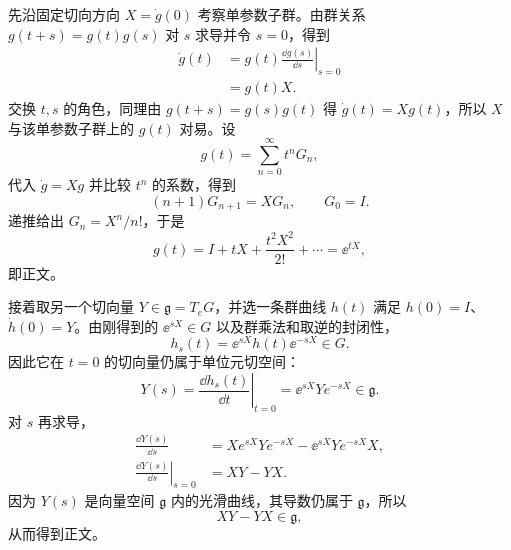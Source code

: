 \begin{derivation}
先沿固定切向方向 $X=\dot g(0)$ 考察单参数子群。由群关系 $g(t+s)=g(t)g(s)$ 对 $s$ 求导并令 $s=0$，得到
\begin{align*}
 \dot g(t)
 &=g(t)\left.\frac{\dd g(s)}{\dd s}\right|_{s=0}\\
 &=g(t)X.
\end{align*}
交换 $t,s$ 的角色，同理由 $g(t+s)=g(s)g(t)$ 得 $\dot g(t)=Xg(t)$，所以 $X$ 与该单参数子群上的 $g(t)$ 对易。设
\begin{equation*}
 g(t)=\sum_{n=0}^{\infty}t^nG_n,
\end{equation*}
代入 $\dot g=Xg$ 并比较 $t^n$ 的系数，得到
\begin{equation*}
 (n+1)G_{n+1}=XG_n,\qquad G_0=I.
\end{equation*}
递推给出 $G_n=X^n/n!$，于是
\begin{equation*}
 g(t)=I+tX+\frac{t^2X^2}{2!}+\cdots=\ee^{tX},
\end{equation*}
即正文。

接着取另一个切向量 $Y\in\mathfrak g=T_eG$，并选一条群曲线 $h(t)$ 满足 $h(0)=I$、$\dot h(0)=Y$。由刚得到的 $\ee^{sX}\in G$ 以及群乘法和取逆的封闭性，
\begin{equation*}
 h_s(t)=\ee^{sX}h(t)\ee^{-sX}\in G.
\end{equation*}
因此它在 $t=0$ 的切向量仍属于单位元切空间：
\begin{equation*}
 Y(s)=\left.\frac{\dd h_s(t)}{\dd t}\right|_{t=0}
 =\ee^{sX}Ye^{-sX}\in\mathfrak g.
\end{equation*}
对 $s$ 再求导，
\begin{align*}
 \frac{\dd Y(s)}{\dd s}
 &=Xe^{sX}Ye^{-sX}-\ee^{sX}Ye^{-sX}X,\\
 \left.\frac{\dd Y(s)}{\dd s}\right|_{s=0}
 &=XY-YX.
\end{align*}
因为 $Y(s)$ 是向量空间 $\mathfrak g$ 内的光滑曲线，其导数仍属于 $\mathfrak g$，所以
\begin{equation*}
 XY-YX\in\mathfrak g,
\end{equation*}
从而得到正文。
\end{derivation}

